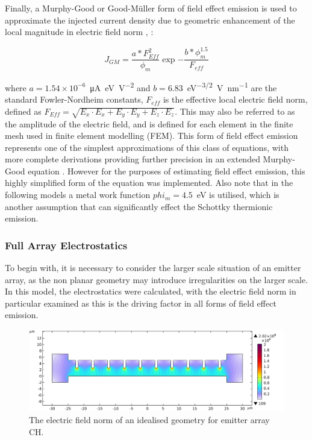 \begin{refsection}
Finally, a Murphy-Good or Good-M\"{u}ller form of field effect emission is used to approximate the injected current density due to geometric enhancement of the local magnitude in electric field norm \cite{Good1956}, \cite{Kyritsakis2015}:

\begin{equation}
    J_{GM} = \frac{a * F_{Eff}^{2}}{\phi_{m}}\exp{-\frac{b*\phi_{m}^{1.5}}{F_{eff}}}
    \label{eq:good-muller}
\end{equation}

where $a=1.54\times10^{-6}$~\si{\micro\ampere\electronvolt\per\volt\squared} and $b=6.83$~\si{\electronvolt^{-3/2}\volt\per\nano\metre} are the standard Fowler-Nordheim constants, $F_{eff}$ is the effective local electric field norm, defined as $F_{Eff} = \sqrt{E_{x}\cdot E_{x} + E_{y}\cdot E_{y} + E_{z}\cdot E_{z}}$. This may also be referred to as the amplitude of the electric field, and is defined for each element in the finite mesh used in finite element modelling (FEM). This form of field effect emission represents one of the simplest approximations of this class of equations, with more complete derivations providing further precision in an extended Murphy-Good equation \cite{Forbes2019}. However for the purposes of estimating field effect emission, this highly simplified form of the equation was implemented. Also note that in the following models a metal work function $phi_{m}=4.5$~\si{\electronvolt} is utilised, which is another assumption that can significantly effect the Schottky thermionic emission.

\subsubsection{Full Array Electrostatics}
To begin with, it is necessary to consider the larger scale situation of an emitter array, as the non planar geometry may introduce irregularities on the larger scale. In this model, the electrostatics were calculated, with the electric field norm in particular examined as this is the driving factor in all forms of field effect emission.

\begin{figure}[H]
    \centering
    \includegraphics[width=\linewidth]{Chapter7/Figs/Raster/Comsol/+150_array_es.png}
    \caption{The electric field norm of an idealised geometry for emitter array CH.}
    \label{fig:c_150_array_es_norme}
\end{figure}


\end{refsection}
